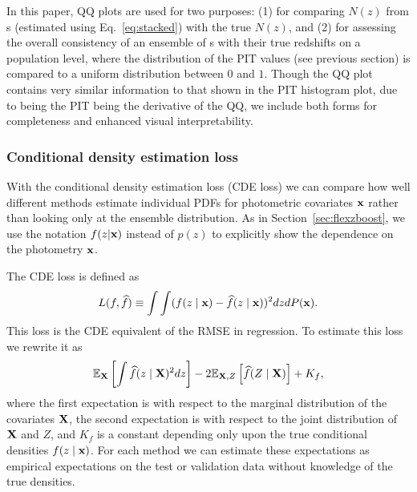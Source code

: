 In this paper, QQ plots are used for two purposes: (1) for comparing $N(z)$ from \pzpdf s (estimated using Eq.~\ref{eq:stacked}) with the true $N(z)$, and (2) for assessing the overall consistency of an ensemble of \pzpdf s with their true redshifts on a population level, where the distribution of the PIT values (see previous section) is compared to a uniform distribution between $0$ and $1$.
Though the QQ plot contains very similar information to that shown in the PIT histogram plot, due to being the PIT being the derivative of the QQ, we include both forms for completeness and enhanced visual interpretability. %

\subsubsection{Conditional density estimation loss}
\label{sec:CDE_loss}

With the conditional density estimation loss (CDE loss) we can compare how well different methods estimate individual PDFs for photometric covariates ${\mathbf{x}}$ rather than looking only at the ensemble distribution.
As in Section~\ref{sec:flexzboost}, we use the notation $f(z \vert {\mathbf{x}})$ instead of $p(z)$ to explicitly show the dependence on the photometry ${\mathbf{x}}$.


The CDE loss is defined as
\begin{equation} \label{eq:cde-loss}
L(f, \widehat{f}) \equiv \int \int (f(z \mid {\mathbf{x}}) - \widehat{f}(z \mid {\mathbf{x}}))^{2} dz dP({\mathbf{x}}) .
\end{equation}
This loss is the CDE equivalent of the RMSE in regression.
To estimate this loss we rewrite it as
\begin{equation} \label{eq:estimated-cde-loss}
\mathbb{E}_{\mathbf{X}} \left[\int \widehat{f}(z \mid {\mathbf{X}})^{2} dz\right] - 2 \mathbb{E}_{{\mathbf{X}},Z}\left[\widehat{f}(Z \mid {\mathbf{X}})\right] + K_{f},
\end{equation}
where the first expectation is with respect to the marginal distribution of the covariates ${\mathbf{X}}$, the second expectation is with respect to the joint distribution of ${\mathbf{X}}$ and $Z$, and $K_{f}$ is a constant depending only upon the true conditional densities $f(z\mid {\mathbf{x}})$.
For each method we can estimate these expectations as empirical expectations on the test or validation data \citep[Eq.~7 in][]{Izbicki:17b} without knowledge of the true densities.

